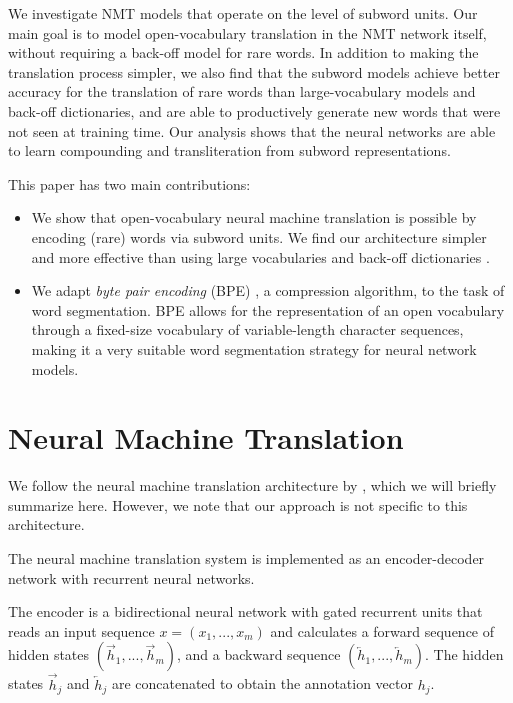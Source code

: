 \documentclass[11pt]{article}
\begin{document}
We investigate NMT models that operate on the level of subword units.
Our main goal is to model open-vocabulary translation in the NMT network itself, without requiring a back-off model for rare words.
In addition to making the translation process simpler, we also find that the subword models achieve better accuracy for the translation of rare words than large-vocabulary models and back-off dictionaries, 
and are able to productively generate new words that were not seen at training time.
Our analysis shows that the neural networks are able to learn compounding and transliteration from subword representations.

This paper has two main contributions:

\begin{itemize}
\setlength{\itemsep}{0pt}
\item We show that open-vocabulary neural machine translation is possible by encoding (rare) words via subword units.
We find our architecture simpler and more effective than using large vocabularies and back-off dictionaries \cite{jean15,DBLP:journals/corr/LuongSLVZ14}.

\item We adapt \emph{byte pair encoding} (BPE) \cite{Gage:1994:NAD:177910.177914}, a compression algorithm, to the task of word segmentation.
BPE allows for the representation of an open vocabulary through a fixed-size vocabulary of variable-length character sequences,
making it a very suitable word segmentation strategy for neural network models.

\end{itemize}

\section{Neural Machine Translation}

We follow the neural machine translation architecture by , which we will briefly summarize here.
However, we note that our approach is not specific to this architecture.

The neural machine translation system is implemented as an encoder-decoder network with recurrent neural networks.

The encoder is a bidirectional neural network with gated recurrent units \cite{cho-EtAl:2014:EMNLP2014} that reads an input sequence $x=(x_1,...,x_m)$ and calculates a forward sequence of hidden states $(\overrightarrow{h}_1,...,\overrightarrow{h}_m)$,
and a backward sequence $(\overleftarrow{h}_1,...,\overleftarrow{h}_m)$.
The hidden states $\overrightarrow{h}_j$ and $\overleftarrow{h}_j$ are concatenated to obtain the annotation vector $h_j$.
\end{document}
